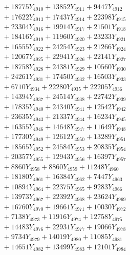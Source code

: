 \documentclass[a4paper,10pt]{article}
\begin{document}
{\begin{align}
&\;  + 18775 Y_{4910} + 13852 Y_{4911} + 9447 Y_{4912} \\[0.3ex]
&\;  + 17622 Y_{4913} + 17437 Y_{4914} + 22398 Y_{4915} \\[0.3ex]
&\;  + 23304 Y_{4916} + 19914 Y_{4917} + 21501 Y_{4918} \\[0.5ex]\allowbreak
&\;  + 18416 Y_{4919} + 11960 Y_{4920} + 23233 Y_{4921} \\[0.3ex]
&\;  + 16555 Y_{4922} + 24254 Y_{4923} + 21266 Y_{4924} \\[0.3ex]
&\;  + 12067 Y_{4925} + 22941 Y_{4926} + 22141 Y_{4927} \\[0.3ex]
&\;  + 18758 Y_{4928} + 24381 Y_{4929} + 10560 Y_{4930} \\[0.3ex]
&\;  + 24261 Y_{4931} + 17450 Y_{4932} + 16503 Y_{4933} \\[0.3ex]
&\;  + 6710 Y_{4934} + 22280 Y_{4935} + 22205 Y_{4936} \\[0.3ex]
&\;  + 14394 Y_{4937} + 24514 Y_{4938} + 22742 Y_{4939} \\[0.3ex]
&\;  + 17835 Y_{4940} + 24340 Y_{4941} + 12542 Y_{4942} \\[0.3ex]
&\;  + 23635 Y_{4943} + 21337 Y_{4944} + 16234 Y_{4945} \\[0.3ex]
&\;  + 16355 Y_{4946} + 14648 Y_{4947} + 11649 Y_{4948} \\[0.5ex]\allowbreak
&\;  + 17730 Y_{4949} + 12612 Y_{4950} + 13289 Y_{4951} \\[0.3ex]
&\;  + 18565 Y_{4952} + 24584 Y_{4953} + 20835 Y_{4954} \\[0.3ex]
&\;  + 20357 Y_{4955} + 12943 Y_{4956} + 16397 Y_{4957} \\[0.3ex]
&\;  + 8860 Y_{4958} + 8860 Y_{4959} + 11248 Y_{4960} \\[0.3ex]
&\;  + 18180 Y_{4961} + 16384 Y_{4962} + 7447 Y_{4963} \\[0.3ex]
&\;  + 10894 Y_{4964} + 22375 Y_{4965} + 9283 Y_{4966} \\[0.3ex]
&\;  + 13973 Y_{4967} + 22392 Y_{4968} + 23624 Y_{4969} \\[0.3ex]
&\;  + 16760 Y_{4970} + 19661 Y_{4971} + 10030 Y_{4972} \\[0.3ex]
&\;  + 7138 Y_{4973} + 11916 Y_{4974} + 12758 Y_{4975} \\[0.3ex]
&\;  + 14483 Y_{4976} + 22931 Y_{4977} + 19066 Y_{4978} \\[0.5ex]\allowbreak
&\;  + 9734 Y_{4979} + 14019 Y_{4980} + 11085 Y_{4981} \\[0.3ex]
&\;  + 14651 Y_{4982} + 13499 Y_{4983} + 12101 Y_{4984} \\[0.3ex]

\end{align}}
\end{document}
